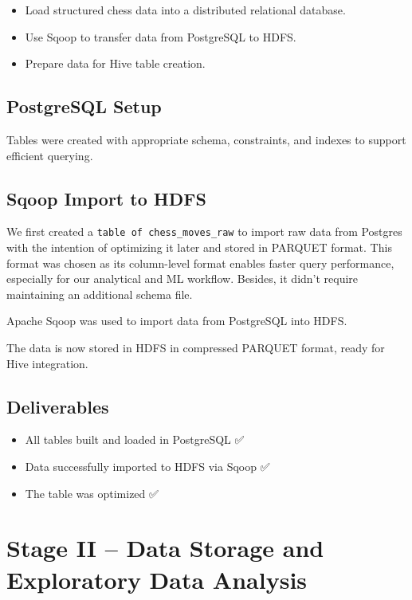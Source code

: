 \documentclass[12pt,a4paper]{article}
\begin{document}
\begin{itemize}
    \item Load structured chess data into a distributed relational database.
    \item Use Sqoop to transfer data from PostgreSQL to HDFS.
    \item Prepare data for Hive table creation.
\end{itemize}

\subsection{PostgreSQL Setup}

Tables were created with appropriate schema, constraints, and indexes to support efficient querying.

\subsection{Sqoop Import to HDFS}

We first created a \texttt{table of chess\_moves\_raw} to import raw data from Postgres with the intention of optimizing it later and stored in PARQUET format. This format was chosen as its column-level format enables faster query performance, especially for our analytical and ML workflow. Besides, it didn't require maintaining an additional schema file.

Apache Sqoop was used to import data from PostgreSQL into HDFS.

The data is now stored in HDFS in compressed PARQUET format, ready for Hive integration.

\subsection{Deliverables}

\begin{itemize}
    \item All tables built and loaded in PostgreSQL ✅
    \item Data successfully imported to HDFS via Sqoop ✅
    \item The table was optimized ✅
\end{itemize}

\section{Stage II -- Data Storage and Exploratory Data Analysis}
\end{document}

